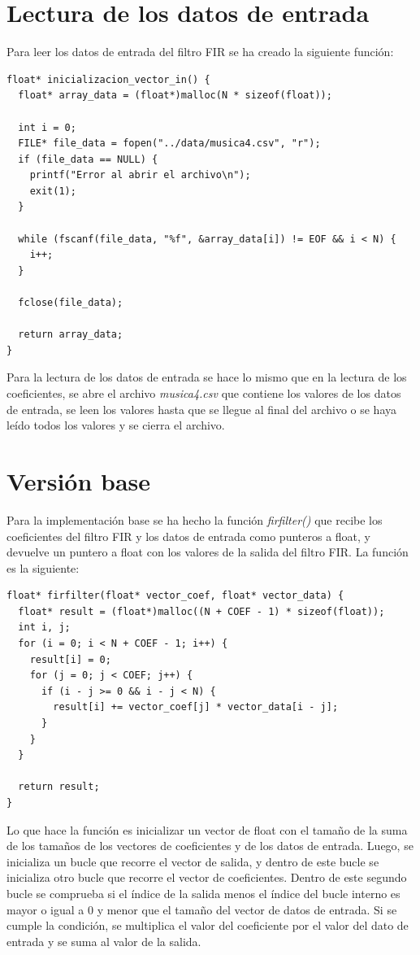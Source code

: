 \documentclass[11pt]{report}
\begin{document}
\section*{Lectura de los datos de entrada}
Para leer los datos de entrada del filtro FIR se ha creado la siguiente función:
\begin{lstlisting}
float* inicializacion_vector_in() {
  float* array_data = (float*)malloc(N * sizeof(float));

  int i = 0;
  FILE* file_data = fopen("../data/musica4.csv", "r");
  if (file_data == NULL) {
    printf("Error al abrir el archivo\n");
    exit(1);
  }

  while (fscanf(file_data, "%f", &array_data[i]) != EOF && i < N) {
    i++;
  }

  fclose(file_data);

  return array_data;
}
\end{lstlisting}

Para la lectura de los datos de entrada se hace lo mismo que en la lectura de los coeficientes, se abre el archivo \emph{musica4.csv} que contiene
los valores de los datos de entrada, se leen los valores hasta que se llegue al final del archivo o se haya leído todos los valores y se cierra el archivo.

\newpage

\section{Versión base}
Para la implementación base se ha hecho la función \emph{firfilter()} que recibe los coeficientes del filtro FIR y los datos de entrada como punteros a float,
y devuelve un puntero a float con los valores de la salida del filtro FIR. La función es la siguiente:

\begin{lstlisting}
float* firfilter(float* vector_coef, float* vector_data) {
  float* result = (float*)malloc((N + COEF - 1) * sizeof(float));
  int i, j;
  for (i = 0; i < N + COEF - 1; i++) {
    result[i] = 0;
    for (j = 0; j < COEF; j++) {
      if (i - j >= 0 && i - j < N) {
        result[i] += vector_coef[j] * vector_data[i - j];
      }
    }
  }

  return result;
}
\end{lstlisting}

Lo que hace la función es inicializar un vector de float con el tamaño de la suma de los tamaños de los vectores de coeficientes y de los datos de entrada.
Luego, se inicializa un bucle que recorre el vector de salida, y dentro de este bucle se inicializa otro bucle que recorre el vector de coeficientes.
Dentro de este segundo bucle se comprueba si el índice de la salida menos el índice del bucle interno es mayor o igual a 0 y menor que el tamaño del vector de datos de entrada.
Si se cumple la condición, se multiplica el valor del coeficiente por el valor del dato de entrada y se suma al valor de la salida.
\end{document}

